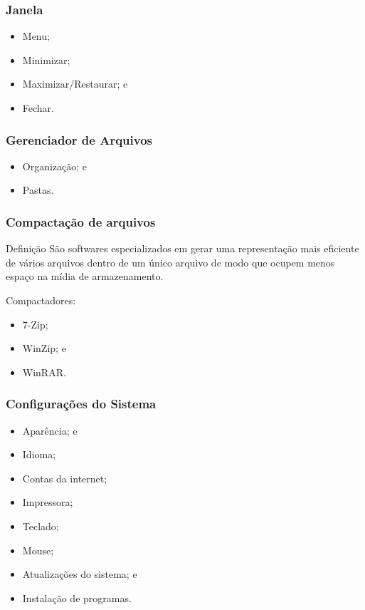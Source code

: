 \documentclass[aspectratio=169]{beamer} %
\begin{document}
\begin{frame}
	\frametitle{Janela}
		
	\begin{itemize}
		\item Menu;
		\item Minimizar;
		\item Maximizar/Restaurar; e
		\item Fechar.
	\end{itemize}
\end{frame}

\begin{frame}
	\frametitle{Gerenciador de Arquivos}
		
	\begin{itemize}
		\item Organiza\c cão; e
		\item Pastas.
	\end{itemize}
\end{frame}

\begin{frame}
	\frametitle{Compacta\c cão de arquivos}
	
	\begin{block}{Defini\c cão}
		São softwares especializados em gerar uma representação mais eficiente de vários arquivos dentro de um único arquivo de modo que ocupem menos espaço na mídia de armazenamento.
	\end{block} \vfill
	
	Compactadores:
	\begin{itemize}
		\item 7-Zip;
		\item WinZip; e
		\item WinRAR.
	\end{itemize}
\end{frame}

\begin{frame}
	\frametitle{Configura\c cões do Sistema}
		
	\begin{itemize}
		\item Aparência; e
		\item Idioma;
		\item Contas da internet;
		\item Impressora;
		\item Teclado;
		\item Mouse;
		\item Atualiza\c cões do sistema; e
		\item Instala\c cão de programas.
	\end{itemize}
\end{frame}
\end{document}
